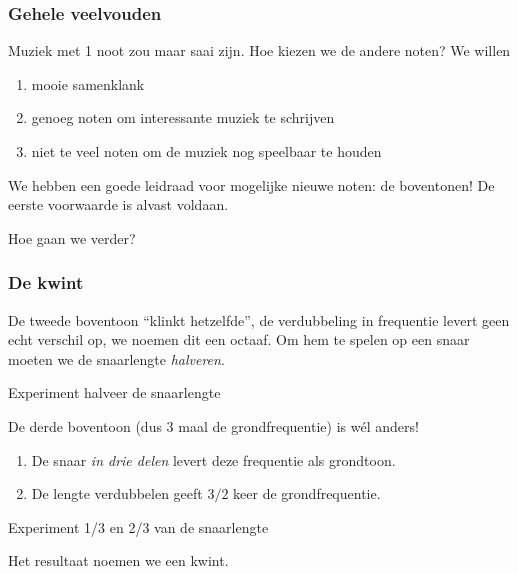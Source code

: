 \documentclass[compress, darktitle, framenumber, totalframenumber, handout]{beamer}
\begin{document}
\begin{frame}
  \frametitle{Gehele veelvouden}

  Muziek met 1 noot zou maar saai zijn. Hoe kiezen we de andere noten? \pause We willen
  \begin{enumerate}
    \item mooie samenklank
    \item \pause genoeg noten om interessante muziek te schrijven
    \item \pause niet te veel noten om de muziek nog speelbaar te houden
  \end{enumerate}

  We hebben een goede leidraad voor mogelijke nieuwe noten: de \alert{boventonen}! De eerste voorwaarde is alvast voldaan.

  Hoe gaan we verder?
\end{frame}

\begin{frame}
  \frametitle{De kwint}

  De \alert{tweede boventoon} ``klinkt hetzelfde'', de verdubbeling in frequentie levert geen echt verschil op, we noemen dit een \alert{octaaf}.
  \pause
  Om hem te spelen op een snaar moeten we de snaarlengte \emph{halveren}.
  \begin{block}{Experiment}
    halveer de snaarlengte
  \end{block}

  \pause

  De \alert{derde boventoon} (dus 3 maal de grondfrequentie) is w\'el anders!

  \begin{enumerate}
    \item De snaar \emph{in drie delen} levert deze frequentie als grondtoon.
    \item \pause De lengte verdubbelen geeft $3/2$ keer de grondfrequentie.
  \end{enumerate}
  \begin{block}{Experiment}
    1/3 en 2/3 van de snaarlengte
  \end{block}
  \pause
  Het resultaat noemen we een \alert{kwint}.
\end{frame}
\end{document}
